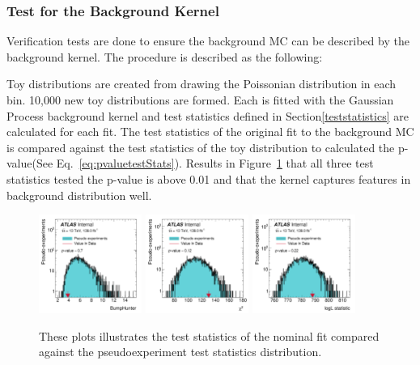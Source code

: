 \subsubsection{Test for the Background Kernel}
Verification tests are done to ensure the background MC can be described by the background kernel. The procedure is described as the following: 

Toy distributions are created from drawing the Poissonian distribution in each bin. 10,000 new toy distributions are formed. Each is fitted with the Gaussian Process background kernel and test statistics defined in Section\ref{teststatistics} are calculated for each fit. The test statistics of the original fit to the background MC is compared against the test statistics of
the toy distribution to calculated the p-value(See Eq.~\ref{eq:pvaluetestStats}). Results in Figure~\ref{fig:nominalstats} that all three test statistics tested the p-value is above 0.01 and that the kernel captures features in background distribution well. 

\begin{figure}[!htb]
    \begin{center}
        \includegraphics[width=0.30\textwidth]{figures/chapter_dimuon/bumpHunterStatPlot}        
        \includegraphics[width=0.30\textwidth]{figures/chapter_dimuon/chi2StatPlot}        
        \includegraphics[width=0.30\textwidth]{figures/chapter_dimuon/logLStatPlot}        
        \caption{
        These plots illustrates the test statistics of the nominal fit compared against the pseudoexperiment test statistics distribution. }
        \label{fig:nominalstats}
    \end{center}
\end{figure}
\FloatBarrier


